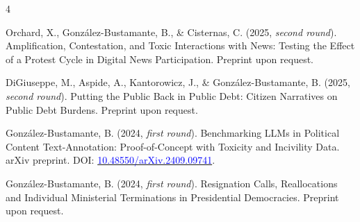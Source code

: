 \begin{publications}

\begin{benumerate}{4}

\item{Orchard, X., González-Bustamante, B., \& Cisternas, C. (2025, {\itshape second round}). Amplification, Contestation, and Toxic Interactions with News: Testing the Effect of a Protest Cycle in Digital News Participation. Preprint upon request.}\vspace{1mm}

\item{DiGiuseppe, M., Aspide, A., Kantorowicz, J., \& González-Bustamante, B. (2025, {\itshape second round}). Putting the Public Back in Public Debt: Citizen Narratives on Public Debt Burdens. Preprint upon request.}\vspace{1mm}

\item{González-Bustamante, B. (2024, {\itshape first round}). Benchmarking LLMs in Political Content Text-Annotation: Proof-of-Concept with Toxicity and Incivility Data. arXiv preprint. DOI: \href{https://doi.org/10.48550/arXiv.2409.09741}{\textcolor{blue}{10.48550/arXiv.2409.09741}}.}\vspace{1mm}

\item{González-Bustamante, B. (2024, {\itshape first round}). Resignation Calls, Reallocations and Individual Ministerial Terminations in Presidential Democracies. Preprint upon request.}\vspace{1mm} %


\end{benumerate}

\end{publications}

